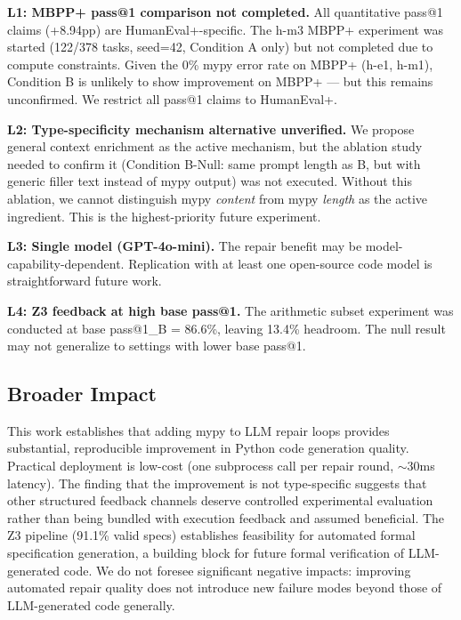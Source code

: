 \textbf{L1: MBPP+ pass@1 comparison not completed.} All quantitative pass@1
claims (+8.94pp) are HumanEval+-specific. The h-m3 MBPP+ experiment was started
(122/378 tasks, seed=42, Condition A only) but not completed due to compute
constraints. Given the 0\% mypy error rate on MBPP+ (h-e1, h-m1), Condition B
is unlikely to show improvement on MBPP+ --- but this remains unconfirmed. We
restrict all pass@1 claims to HumanEval+.

\textbf{L2: Type-specificity mechanism alternative unverified.} We propose
general context enrichment as the active mechanism, but the ablation study
needed to confirm it (Condition B-Null: same prompt length as B, but with
generic filler text instead of mypy output) was not executed. Without this
ablation, we cannot distinguish mypy \emph{content} from mypy \emph{length} as
the active ingredient. This is the highest-priority future experiment.

\textbf{L3: Single model (GPT-4o-mini).} The repair benefit may be
model-capability-dependent. Replication with at least one open-source code
model is straightforward future work.

\textbf{L4: Z3 feedback at high base pass@1.} The arithmetic subset experiment
was conducted at base pass@1\_B = 86.6\%, leaving 13.4\% headroom. The null
result may not generalize to settings with lower base pass@1.

\subsection{Broader Impact}

This work establishes that adding mypy to LLM repair loops provides substantial,
reproducible improvement in Python code generation quality. Practical deployment
is low-cost (one subprocess call per repair round, ${\sim}$30ms latency). The
finding that the improvement is not type-specific suggests that other structured
feedback channels deserve controlled experimental evaluation rather than being
bundled with execution feedback and assumed beneficial. The Z3 pipeline
(91.1\% valid specs) establishes feasibility for automated formal specification
generation, a building block for future formal verification of LLM-generated
code. We do not foresee significant negative impacts: improving automated repair
quality does not introduce new failure modes beyond those of LLM-generated code
generally.
